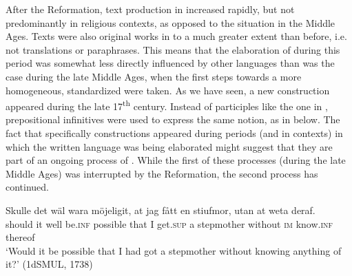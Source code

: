 \documentclass[output=paper]{langscibook}
\begin{document}
After the Reformation, text production in  increased rapidly, but not predominantly in religious contexts, as opposed to the situation in the Middle Ages. Texts were also original works in  to a much greater extent than before, i.e. not translations or paraphrases. This means that the elaboration of  during this period was somewhat less directly influenced by other languages than was the case during the late Middle Ages, when the first steps towards a more homogeneous, standardized  were taken. As we have seen, a new  construction appeared during the late 17\textsuperscript{th} century. Instead of participles like the one in , prepositional infinitives were used to express the same  notion, as in  below. The fact that specifically  constructions appeared during periods (and in contexts) in which the written language was being elaborated might suggest that they are part of an ongoing process of . While the first of these processes (during the late Middle Ages) was interrupted by the Reformation, the second process has continued. 


\ea
\label{ex:kalm:34}
 \gll Skulle det wäl wara möjeligit, at jag fått en stiufmor, utan at weta deraf.\\
should it well be.\textsc{inf} possible that I get.\textsc{sup} a stepmother without \textsc{im} know.\textsc{inf} thereof\\
\glt ‘Would it be possible that I had got a stepmother without knowing anything of it?’ (1dSMUL, 1738)
\z
\end{document}
